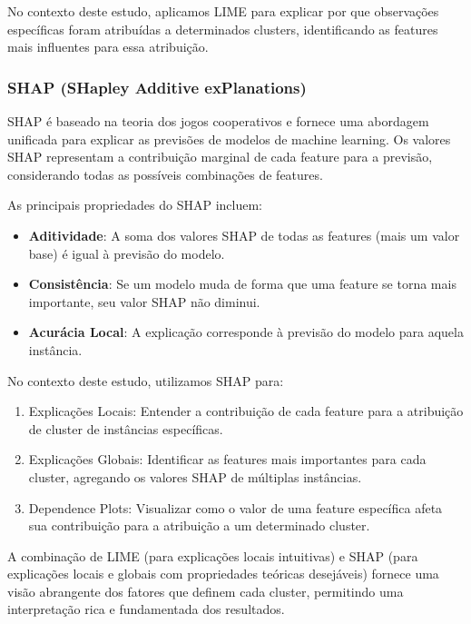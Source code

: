 \documentclass[conference]{IEEEtran}
\begin{document}
No contexto deste estudo, aplicamos LIME para explicar por que observações específicas foram atribuídas a determinados clusters, identificando as features mais influentes para essa atribuição.

\subsubsection{SHAP (SHapley Additive exPlanations)}
SHAP \cite{lundberg2017unified} é baseado na teoria dos jogos cooperativos e fornece uma abordagem unificada para explicar as previsões de modelos de machine learning. Os valores SHAP representam a contribuição marginal de cada feature para a previsão, considerando todas as possíveis combinações de features.

As principais propriedades do SHAP incluem:

\begin{itemize}
    \item \textbf{Aditividade}: A soma dos valores SHAP de todas as features (mais um valor base) é igual à previsão do modelo.
    \item \textbf{Consistência}: Se um modelo muda de forma que uma feature se torna mais importante, seu valor SHAP não diminui.
    \item \textbf{Acurácia Local}: A explicação corresponde à previsão do modelo para aquela instância.
\end{itemize}

No contexto deste estudo, utilizamos SHAP para:

\begin{enumerate}
    \item Explicações Locais: Entender a contribuição de cada feature para a atribuição de cluster de instâncias específicas.
    \item Explicações Globais: Identificar as features mais importantes para cada cluster, agregando os valores SHAP de múltiplas instâncias.
    \item Dependence Plots: Visualizar como o valor de uma feature específica afeta sua contribuição para a atribuição a um determinado cluster.
\end{enumerate}

A combinação de LIME (para explicações locais intuitivas) e SHAP (para explicações locais e globais com propriedades teóricas desejáveis) fornece uma visão abrangente dos fatores que definem cada cluster, permitindo uma interpretação rica e fundamentada dos resultados.
\end{document}
